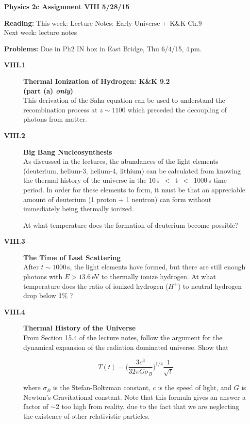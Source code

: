 \documentclass[11pt]{article}
\begin{document}
%
\centerline{\large\bf Physics 2c \hfill Assignment VIII \hfill  5/28/15}

\medskip
\begin{list}{}{\leftmargin 2.4cm  .2cm }
\item[{\bf Reading:}  \hfill ] This week: Lecture Notes: Early Universe + K\&K Ch.9 \\
                              Next week: lecture notes
\item[{\bf Problems:} \hfill ] Due in Ph2 IN box in East Bridge, Thu 6/4/15, 4\,pm.
\end{list}

\begin{description}

\item[{\bf VIII.1} ] {\bf Thermal Ionization of Hydrogen: K\&K 9.2} \\
\textbf{(part (a) \emph{only})}\\
This derivation of the Saha equation can be used to understand the
recombination process at $z \sim 1100$ which preceded the decoupling
of photons from matter.


\item[{\bf VIII.2} ] {\bf Big Bang Nucleosynthesis}\\
As discussed in the lectures, the abundances of the light elements
(deuterium, helium-3, helium-4, lithium) can be calculated from knowing
the thermal history of the universe in the 10\,s~$<$~t~$<$~1000\,s time
period. In order for these elements to form, it must be that an
appreciable amount of deuterium (1 proton + 1 neutron) can form
without immediately being thermally ionized.

At what temperature does the formation of deuterium become possible?



\item[{\bf VIII.3} ] {\bf The Time of Last Scattering}\\
After $t \sim 1000$\,s, the light elements have formed,
but there are still enough photons with $E > 13.6$\,eV to thermally
ionize hydrogen. At what temperature does the ratio of ionized hydrogen 
($H^{+}$) to neutral hydrogen drop below 1\% ?


\item[{\bf VIII.4} ] {\bf Thermal History of the Universe} \\
From Section 15.4 of the lecture notes, follow the argument for the
dynamical expansion of the radiation dominated universe. Show that

\begin{equation}
T(t) = \bigg(\frac{3 c^3}{32 \pi G \sigma_B}\bigg)^{1/4} \frac{1}{\sqrt{t}}
\end{equation}

where $\sigma_B$ is the Stefan-Boltzman constant, $c$ is the speed of light, and $G$ is Newton's Gravitational constant. Note that this formula gives an answer a factor of $\sim$2 too high from reality, due to the fact that we are neglecting the existence of other relativistic particles.

\end{description}
\end{document}
